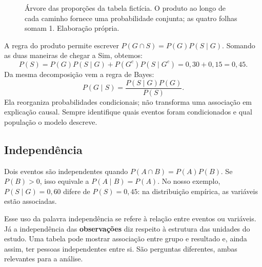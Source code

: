\begin{figure}[H]
\centering
{}
\caption{Árvore das proporções da tabela fictícia. O produto ao longo de cada caminho fornece uma probabilidade conjunta; as quatro folhas somam 1. Elaboração própria.}
\label{fig:arvore-probabilidades}
\end{figure}

A regra do produto permite escrever $P(G\cap S)=P(G)P(S\mid G)$. Somando as duas maneiras de chegar a Sim, obtemos:
\[
P(S)=P(G)P(S\mid G)+P(G^c)P(S\mid G^c)
=0{,}30+0{,}15=0{,}45.
\]
Da mesma decomposição vem a regra de Bayes:
\[
P(G\mid S)=\frac{P(S\mid G)P(G)}{P(S)}.
\]
Ela reorganiza probabilidades condicionais; não transforma uma associação em explicação causal. Sempre identifique quais eventos foram condicionados e qual população o modelo descreve.

\subsection{Independência}

Dois eventos são independentes quando $P(A\cap B)=P(A)P(B)$. Se $P(B)>0$, isso equivale a $P(A\mid B)=P(A)$. No nosso exemplo, $P(S\mid G)=0{,}60$ difere de $P(S)=0{,}45$: na distribuição empírica, as variáveis estão associadas.

Esse uso da palavra independência se refere à relação entre eventos ou variáveis. Já a independência das \textbf{observações} diz respeito à estrutura das unidades do estudo. Uma tabela pode mostrar associação entre grupo e resultado e, ainda assim, ter pessoas independentes entre si. São perguntas diferentes, ambas relevantes para a análise.

